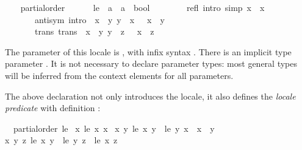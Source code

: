 \begin{isabellebody}
\begin{isamarkuptext}
\end{isamarkuptext}%
\isamarkuptrue%
\ \ \isamarkupfalse%
\ partial{\isacharunderscore}order\ {\isacharequal}\isanewline
\ \ \ \ \ le\ {\isacharcolon}{\isacharcolon}\ {\isachardoublequoteopen}{\isacharprime}a\ {\isasymRightarrow}\ {\isacharprime}a\ {\isasymRightarrow}\ bool{\isachardoublequoteclose}\ {\isacharparenleft}\ {\isachardoublequoteopen}{\isasymsqsubseteq}{\isachardoublequoteclose}\ {}{}{\isacharparenright}\isanewline
\ \ \ \ \ refl\ {\isacharbrackleft}intro{\isacharcomma}\ simp{\isacharbrackright}{\isacharcolon}\ {\isachardoublequoteopen}x\ {\isasymsqsubseteq}\ x{\isachardoublequoteclose}\isanewline
\ \ \ \ \ \ \ anti{\isacharunderscore}sym\ {\isacharbrackleft}intro{\isacharbrackright}{\isacharcolon}\ {\isachardoublequoteopen}{\isasymlbrakk}\ x\ {\isasymsqsubseteq}\ y{\isacharsemicolon}\ y\ {\isasymsqsubseteq}\ x\ {\isasymrbrakk}\ {\isasymLongrightarrow}\ x\ {\isacharequal}\ y{\isachardoublequoteclose}\isanewline
\ \ \ \ \ \ \ trans\ {\isacharbrackleft}trans{\isacharbrackright}{\isacharcolon}\ {\isachardoublequoteopen}{\isasymlbrakk}\ x\ {\isasymsqsubseteq}\ y{\isacharsemicolon}\ y\ {\isasymsqsubseteq}\ z\ {\isasymrbrakk}\ {\isasymLongrightarrow}\ x\ {\isasymsqsubseteq}\ z{\isachardoublequoteclose}%
\begin{isamarkuptext}%
The parameter of this locale is , with infix syntax
  \isa{{\isasymsqsubseteq}}.  There is an implicit type parameter .  It
  is not necessary to declare parameter types: most general types will
  be inferred from the context elements for all parameters.

  The above declaration not only introduces the locale, it also
  defines the \emph{locale predicate}  with
  definition :
  \begin{isabelle}%
\ \ partial{\isacharunderscore}order\ {\isacharquery}le\ {\isasymequiv}\isanewline
\isaindent{\ \ }{\isacharparenleft}{\isasymforall}x{\isachardot}\ {\isacharquery}le\ x\ x{\isacharparenright}\ {\isasymand}\isanewline
\isaindent{\ \ }{\isacharparenleft}{\isasymforall}x\ y{\isachardot}\ {\isacharquery}le\ x\ y\ {\isasymlongrightarrow}\ {\isacharquery}le\ y\ x\ {\isasymlongrightarrow}\ x\ {\isacharequal}\ y{\isacharparenright}\ {\isasymand}\isanewline
\isaindent{\ \ }{\isacharparenleft}{\isasymforall}x\ y\ z{\isachardot}\ {\isacharquery}le\ x\ y\ {\isasymlongrightarrow}\ {\isacharquery}le\ y\ z\ {\isasymlongrightarrow}\ {\isacharquery}le\ x\ z{\isacharparenright}%
\end{isabelle}


\end{isamarkuptext}
\end{isabellebody}
